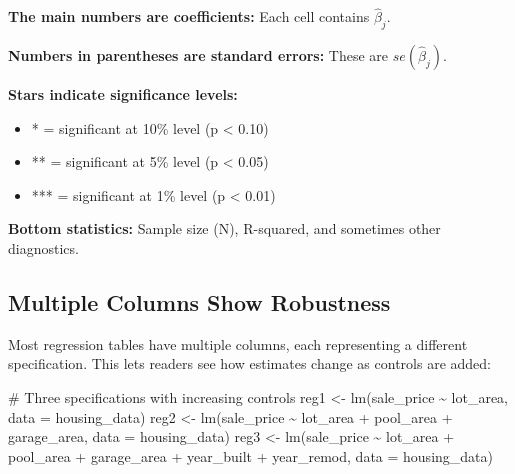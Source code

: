 \documentclass[
  letterpaper,
  DIV=11,
  numbers=noendperiod]{scrreprt}
\newenvironment{Shaded}{\begin{snugshade}}{\end{snugshade}}
\newcommand{\AttributeTok}[1]{\textcolor[rgb]{0.40,0.45,0.13}{#1}}
\newcommand{\CommentTok}[1]{\textcolor[rgb]{0.37,0.37,0.37}{#1}}
\newcommand{\FunctionTok}[1]{\textcolor[rgb]{0.28,0.35,0.67}{#1}}
\newcommand{\NormalTok}[1]{\textcolor[rgb]{0.00,0.23,0.31}{#1}}
\newcommand{\OtherTok}[1]{\textcolor[rgb]{0.00,0.23,0.31}{#1}}
\newcommand{\SpecialCharTok}[1]{\textcolor[rgb]{0.37,0.37,0.37}{#1}}
\providecommand{\tightlist}{%
  \setlength{\itemsep}{0pt}\setlength{\parskip}{0pt}}
\begin{document}
\textbf{The main numbers are coefficients:} Each cell contains
\(\hat{\beta}_j\).

\textbf{Numbers in parentheses are standard errors:} These are
\(se(\hat{\beta}_j)\).

\textbf{Stars indicate significance levels:}

\begin{itemize}
\tightlist
\item
  * = significant at 10\% level (p \textless{} 0.10)
\item
  ** = significant at 5\% level (p \textless{} 0.05)
\item
  *** = significant at 1\% level (p \textless{} 0.01)
\end{itemize}

\textbf{Bottom statistics:} Sample size (N), R-squared, and sometimes
other diagnostics.

\subsection{Multiple Columns Show
Robustness}\label{multiple-columns-show-robustness}

Most regression tables have multiple columns, each representing a
different specification. This lets readers see how estimates change as
controls are added:

\begin{Shaded}
\begin{Highlighting}[]
\CommentTok{\# Three specifications with increasing controls}
\NormalTok{reg1 }\OtherTok{\textless{}{-}} \FunctionTok{lm}\NormalTok{(sale\_price }\SpecialCharTok{\textasciitilde{}}\NormalTok{ lot\_area, }\AttributeTok{data =}\NormalTok{ housing\_data)}
\NormalTok{reg2 }\OtherTok{\textless{}{-}} \FunctionTok{lm}\NormalTok{(sale\_price }\SpecialCharTok{\textasciitilde{}}\NormalTok{ lot\_area }\SpecialCharTok{+}\NormalTok{ pool\_area }\SpecialCharTok{+}\NormalTok{ garage\_area, }\AttributeTok{data =}\NormalTok{ housing\_data)}
\NormalTok{reg3 }\OtherTok{\textless{}{-}} \FunctionTok{lm}\NormalTok{(sale\_price }\SpecialCharTok{\textasciitilde{}}\NormalTok{ lot\_area }\SpecialCharTok{+}\NormalTok{ pool\_area }\SpecialCharTok{+}\NormalTok{ garage\_area }\SpecialCharTok{+} 
\NormalTok{             year\_built }\SpecialCharTok{+}\NormalTok{ year\_remod, }\AttributeTok{data =}\NormalTok{ housing\_data)}
\end{Highlighting}
\end{Shaded}
\end{document}
